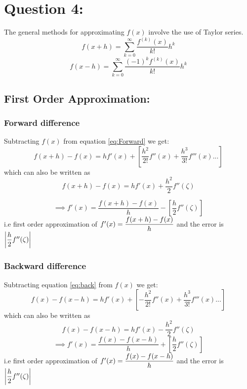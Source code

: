 \documentclass[11pt, a4paper]{article}
\begin{document}
\section{Question 4:}
\label{Question4}
The general methods for approximating $f(x)$ involve the use of Taylor series.
\begin{equation}
\label{eq:Forward}
 f(x+h) = \sum\limits_{k=0}^{\infty}\frac{f^{(k)}(x)}{k!}h^k
\end{equation}
\begin{equation}
\label{eq:back}
 f(x-h) = \sum\limits_{k=0}^{\infty}\frac{(-1)^kf^{(k)}(x)}{k!}h^k
\end{equation}

\subsection{First Order Approximation:}
\subsubsection{Forward difference}
Subtracting $f(x)$ from equation \ref{eq:Forward} we get:
\begin{equation*}
 f(x+h) - f(x) = hf'(x) + \left[\frac{h^2}{2!}f''(x) + \frac{h^3}{3!}f'''(x) ...\right]
\end{equation*}
which can also be written as
\begin{equation*}
 f(x+h) - f(x) = hf'(x) + \frac{h^2}{2}f''(\zeta)
\end{equation*}

\begin{equation}
\implies f'(x) = \frac{f(x+h)-f(x)}{h} - \left[ \frac{h}{2}f''(\zeta) \right]
\end{equation}
i.e first order approximation of $f'(x) = \mathlarger{\frac{f(x+h) - f(x)}{h}}$ and the error is $\left|\mathlarger
{\frac{h}{2}}f''(\zeta)\right|$
\subsubsection{Backward difference}
Subtracting equation \ref{eq:back} from $f(x)$ we get:
\begin{equation*}
 f(x) - f(x-h) = hf'(x) + \left[-\frac{h^2}{2!}f''(x) + \frac{h^3}{3!}f'''(x) ...\right]
\end{equation*}
which can also be written as
\begin{equation*}
 f(x) - f(x-h) = hf'(x) - \frac{h^2}{2}f''(\zeta)
\end{equation*}
\begin{equation}
\implies f'(x) = \frac{f(x)-f(x-h)}{h} + \left[\frac{h}{2}f''(\zeta) \right]
\end{equation}
i.e first order approximation of $f'(x) = \mathlarger{\frac{f(x) - f(x-h)}{h}}$ and the error is $\left|\mathlarger
{\frac{h}{2}}f''(\zeta)\right|$
\end{document}
